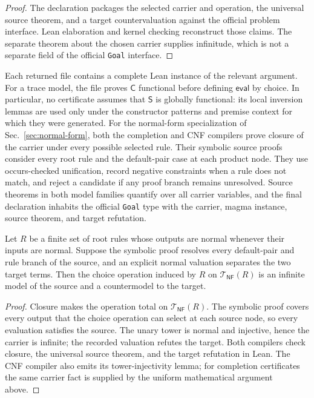 \documentclass[runningheads]{llncs}
\newcommand{\Tree}{\mathcal{T}}
\newcommand{\Code}{\mathsf{C}}
\newcommand{\Step}{\mathsf{S}}
\newcommand{\evalop}{\mathsf{eval}}
\begin{document}
\begin{proof}
The declaration packages the selected carrier and operation, the universal
source theorem, and a target countervaluation against the official problem
interface.  Lean elaboration and kernel checking reconstruct those claims.
The separate theorem about the chosen carrier supplies infinitude, which is not a
separate field of the official \texttt{Goal} interface.
\end{proof}


Each returned file contains a complete Lean instance of the relevant argument.
For a trace model, the file proves $\Code$ functional before defining
$\evalop$ by choice.
In particular, no certificate assumes that $\Step$ is globally functional:
its local inversion lemmas are used only under the constructor patterns and
premise context for which they were generated.
For the normal-form specialization of Sec.~\ref{sec:normal-form}, both the
completion and CNF compilers prove closure of the carrier under every possible
selected rule.  Their symbolic source proofs consider every root rule and the
default-pair case at each product node.  They use occurs-checked unification,
record negative constraints when a rule does not match, and reject a candidate
if any proof branch remains unresolved.
Source theorems in both model families quantify over all carrier variables,
and the final declaration inhabits the official
\texttt{Goal} type with the carrier, magma instance, source theorem, and target
refutation.

\begin{proposition}
\label{prop:nf-soundness}
Let $R$ be a finite set of root rules whose outputs are normal whenever their
inputs are normal.  Suppose the symbolic proof resolves every default-pair and
rule branch of the source, and an explicit normal valuation separates the two
target terms.  Then the choice operation induced by $R$ on
$\Tree_{\mathsf{NF}}(R)$ is an infinite model of the source and a countermodel
to the target.
\end{proposition}

\begin{proof}
Closure makes the operation total on $\Tree_{\mathsf{NF}}(R)$.  The symbolic
proof covers every output that the choice operation can select at each source
node, so every evaluation satisfies the source.  The unary tower is normal and
injective, hence the carrier is infinite; the recorded valuation refutes the
target.  Both compilers check closure, the universal source theorem, and the
target refutation in Lean.  The CNF compiler also emits its tower-injectivity
lemma; for completion certificates the same carrier fact is supplied by the
uniform mathematical argument above.
\end{proof}
\end{document}
